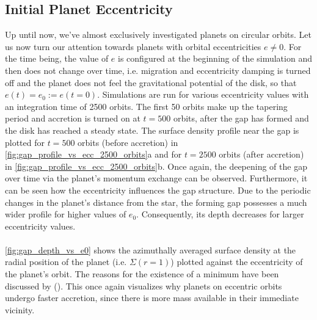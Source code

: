     \subsection{Initial Planet Eccentricity}
      Up until now, we've almost exclusively investigated planets on circular 
      orbits. Let us now turn our attention towards planets with orbital 
      eccentricities
      $e\neq0$. For the time being, the value of $e$ is configured at the 
      beginning of the simulation and then does not change over time, i.e. 
      migration and eccentricity damping is turned off and the planet 
      does not feel the gravitational potential of the disk, so that 
      $e(t)=e_0:=e(t=0)$. Simulations are run 
      for various eccentricity values with an integration time of 2500 orbits.
      The first 50 orbits make up the tapering period and accretion is 
      turned on at $t=500$ orbits, after the gap has formed and the disk has 
      reached a steady state. 
      The surface density profile near the gap is plotted for $t=500$ orbits
      (before accretion) in \autoref{fig:gap_profile_vs_ecc_2500_orbits}a and 
      for $t=2500$ orbits (after accretion) in
      \autoref{fig:gap_profile_vs_ecc_2500_orbits}b.
      Once again, the deepening of the gap over time via the planet's 
      momentum exchange can be observed. Furthermore, it can be seen how 
      the eccentricity influences the gap structure. Due to the periodic 
      changes in the planet's distance from the star, the forming gap 
      possesses a much wider profile for higher values of $e_0$. 
      Consequently, its depth decreases for larger eccentricity values. \\
      \\
      \autoref{fig:gap_depth_vs_e0} shows the azimuthally averaged surface 
      density at the radial position of the planet (i.e. $\Sigma(r=1)$)
      plotted against the eccentricity of the planet's orbit. The 
      reasons for the existence of a minimum have been discussed by 
      \citeauthor{Thun_2017} (\citeyear{Thun_2017}). This once again visualizes
      why planets on eccentric orbits undergo faster accretion, since there 
      is more mass available in their immediate vicinity.
